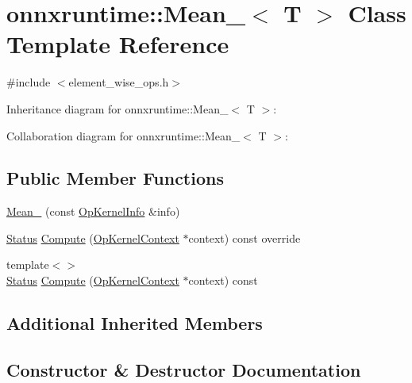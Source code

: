 \hypertarget{classonnxruntime_1_1Mean__8}{}\section{onnxruntime\+:\+:Mean\+\_$<$ T $>$ Class Template Reference}
\label{classonnxruntime_1_1Mean__8}


{\ttfamily \#include $<$element\+\_\+wise\+\_\+ops.\+h$>$}



Inheritance diagram for onnxruntime\+:\+:Mean\+\_$<$ T $>$\+:


Collaboration diagram for onnxruntime\+:\+:Mean\+\_$<$ T $>$\+:
\subsection*{Public Member Functions}
\begin{DoxyCompactItemize}
\item 
\mbox{\hyperlink{classonnxruntime_1_1Mean__8_a8f5925811f960cfb5065fd77a03f1afa}{Mean\+\_}} (const \mbox{\hyperlink{classonnxruntime_1_1OpKernelInfo}{Op\+Kernel\+Info}} \&info)
\item 
\mbox{\hyperlink{classonnxruntime_1_1common_1_1Status}{Status}} \mbox{\hyperlink{classonnxruntime_1_1Mean__8_a18115785b41a8fe635792587d06b8658}{Compute}} (\mbox{\hyperlink{classonnxruntime_1_1OpKernelContext}{Op\+Kernel\+Context}} $\ast$context) const override
\item 
{\footnotesize template$<$$>$ }\\\mbox{\hyperlink{classonnxruntime_1_1common_1_1Status}{Status}} \mbox{\hyperlink{classonnxruntime_1_1Mean__8_a74e7ff61abf552d8029741dedc2981e5}{Compute}} (\mbox{\hyperlink{classonnxruntime_1_1OpKernelContext}{Op\+Kernel\+Context}} $\ast$context) const
\end{DoxyCompactItemize}
\subsection*{Additional Inherited Members}


\subsection{Constructor \& Destructor Documentation}
\mbox{\label{classonnxruntime_1_1Mean__8_a8f5925811f960cfb5065fd77a03f1afa}} 
